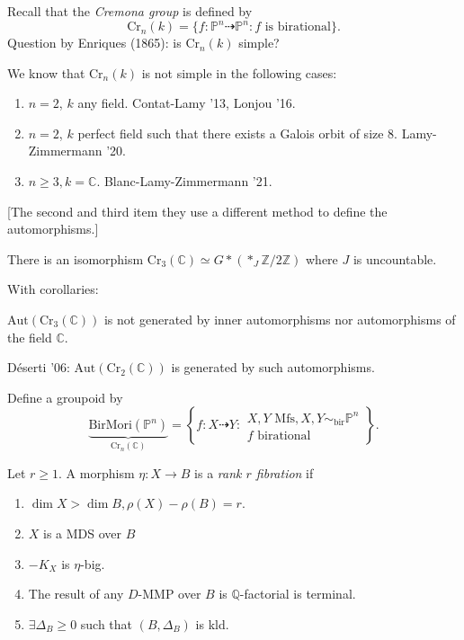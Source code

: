 Recall that the {\it Cremona group} is
defined by
$$
\text{Cr}_n(k)=
\{f:\mathbb{P}^n \dashrightarrow
\mathbb{P}^n:
f\text{ is birational}\}.
$$
Question by Enriques (1865):
is $\text{Cr}_n(k)$ simple?

We know that $\text{Cr}_n(k)$ is not simple
in the following cases:
\begin{enumerate}
\item $n=2$, $k$ any field.
Contat-Lamy '13, Lonjou '16.

\item $n=2$, $k$ perfect field
such that there exists a Galois orbit of size
8.
Lamy-Zimmermann '20.

\item $n \geq 3, k=\mathbb{C}$.
Blanc-Lamy-Zimmermann '21.
\end{enumerate}

[The second and third item they use a
different method
to define the automorphisms.]

\begin{theorem}
\label{theorem-cr3}
There is an isomorphism
$\text{Cr}_3(\mathbb{C}) \simeq
G \ast (\ast_J \mathbb{Z}/2\mathbb{Z})$
where $J$ is uncountable.
\end{theorem}

With corollaries:

\begin{corollary}
\label{lemma-corollary}
$\text{Aut}(\text{Cr}_3(\mathbb{C}))$
is not generated by inner automorphisms
nor automorphisms of the field $\mathbb{C}$.
\end{corollary}

Déserti '06:
$\text{Aut}(\text{Cr}_2(\mathbb{C}))$
is generated by such automorphisms.

\medskip{}

Define a groupoid by
$$
\underbrace{\text{BirMori}(\mathbb{P}^n)}
_{\text{Cr}_n(\mathbb{C})}
=
\left\{f:X \dashrightarrow Y
:\substack{X,Y \text{ Mfs}, X,Y
\sim_{\text{bir}}\mathbb{P}^n \\
f\text{ birational}}\right\}.
$$
\begin{definition}
\label{definition-rank-r-fibration}
Let $r \geq 1$.
A morphism  $\eta:X \to B$ is a {\it rank $r$
fibration}
if
\begin{enumerate}
\item $\dim X > \dim B, \rho(X)-\rho(B) = r$.
\item $X$ is a MDS over $B$
\item $-K_X$ is $\eta$-big.
\item The result of any
$D$-MMP over $B$ is
$\mathbb{Q}$-factorial is terminal.
\item $\exists \Delta_B \geq 0$
such that $(B,\Delta_B)$ is kld.
\end{enumerate}
\end{definition}

